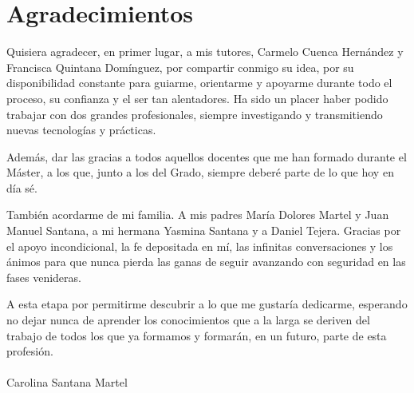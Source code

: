 \chapter*{Agradecimientos}

Quisiera agradecer, en primer lugar, a mis tutores, Carmelo Cuenca Hernández y Francisca Quintana Domínguez, por compartir conmigo su idea, por su disponibilidad constante para guiarme, orientarme y apoyarme durante todo el proceso, su confianza y el ser tan alentadores. Ha sido un placer haber podido trabajar con dos grandes profesionales, siempre investigando y transmitiendo nuevas tecnologías y prácticas.  

Además, dar las gracias a todos aquellos docentes que me han formado durante el Máster, a los que, junto a los del Grado, siempre deberé parte de lo que hoy en día sé.

También acordarme de mi familia. A mis padres María Dolores Martel y Juan Manuel Santana, a mi hermana Yasmina Santana y a Daniel Tejera. Gracias por el apoyo incondicional, la fe depositada en mí, las infinitas conversaciones y los ánimos para que nunca pierda las ganas de seguir avanzando con seguridad en las fases venideras.

A esta etapa por permitirme descubrir a lo que me gustaría dedicarme, esperando no dejar nunca de aprender los conocimientos que a la larga se deriven del trabajo de todos los que ya formamos y formarán, en un futuro, parte de esta profesión.
\\
\\
Carolina Santana Martel